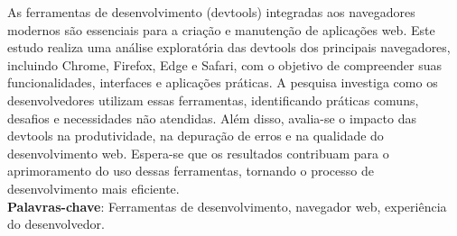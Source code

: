 
\begin{resumo}[RESUMO]
\begin{SingleSpacing}


As ferramentas de desenvolvimento (devtools) integradas aos navegadores modernos são essenciais para a criação e manutenção de aplicações web. Este estudo realiza uma análise exploratória das devtools dos principais navegadores, incluindo Chrome, Firefox, Edge e Safari, com o objetivo de compreender suas funcionalidades, interfaces e aplicações práticas. A pesquisa investiga como os desenvolvedores utilizam essas ferramentas, identificando práticas comuns, desafios e necessidades não atendidas. Além disso, avalia-se o impacto das devtools na produtividade, na depuração de erros e na qualidade do desenvolvimento web. Espera-se que os resultados contribuam para o aprimoramento do uso dessas ferramentas, tornando o processo de desenvolvimento mais eficiente. \\

\textbf{Palavras-chave}: Ferramentas de desenvolvimento, navegador web, experiência do desenvolvedor.

\end{SingleSpacing}
\end{resumo}

